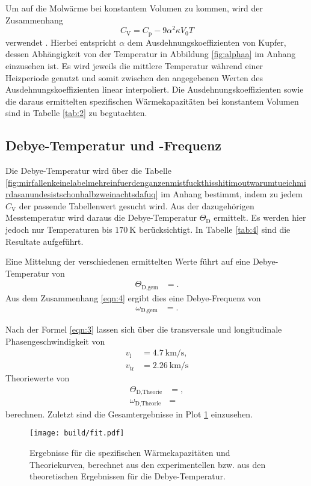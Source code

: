 Um auf die Molwärme bei konstantem Volumen zu kommen, wird der Zusammenhang
\begin{equation}
  C_{\text{V}} = C_{\text{p}} - 9 \alpha^2 \kappa V_0 T
\end{equation}
verwendet \cite{skript}.
Hierbei entspricht $\alpha$ dem Ausdehnungskoeffizienten von Kupfer, dessen Abhängigkeit von der Temperatur in Abbildung \ref{fig:alphaa} im Anhang einzusehen ist.
Es wird jeweils die mittlere Temperatur während einer Heizperiode genutzt und somit zwischen den angegebenen Werten des Ausdehnungskoeffizienten linear interpoliert.
Die Ausdehnungskoeffizienten sowie die daraus ermittelten spezifischen Wärmekapazitäten bei konstantem Volumen sind in Tabelle \ref{tab:2} zu begutachten.



\subsection{Debye-Temperatur und -Frequenz}

Die Debye-Temperatur wird über die Tabelle \ref{fig:mirfallenkeinelabelmehreinfuerdenganzenmistfuckthisshitimoutwarumtueichmirdasanundesistschonhalbzweinachtsdafuq} im Anhang bestimmt, indem zu jedem $C_{\text{V}}$ der passende Tabellenwert gesucht wird.
Aus der dazugehörigen Messtemperatur wird daraus die Debye-Temperatur $\Theta_\text{D}$ ermittelt.
Es werden hier jedoch nur Temperaturen bis $\SI{170}{\kelvin}$ berücksichtigt.
In Tabelle \ref{tab:4} sind die Resultate aufgeführt.



Eine Mittelung der verschiedenen ermittelten Werte führt auf eine Debye-Temperatur von
\begin{align*}
  \Theta_{\text{D,gem}} &= .
\end{align*}
Aus dem Zusammenhang \eqref{eqn:4} ergibt dies eine Debye-Frequenz von
\begin{align*}
  \omega_{\text{D,gem}} &= .
\end{align*}

Nach der Formel \eqref{eqn:3} lassen sich über die transversale und longitudinale Phasengeschwindigkeit \cite{skript} von
\begin{align*}
  v_{\text{l}}  &= \SI{4.7}{\kilo\meter\per\second},\\
  v_{\text{tr}} &= \SI{2.26}{\kilo\meter\per\second}
\end{align*}
Theoriewerte von
\begin{align*}
  \Theta_{\text{D,Theorie}} &= ,\\
  \omega_{\text{D,Theorie}} &= 
\end{align*}
berechnen.
Zuletzt sind die Gesamtergebnisse in Plot \ref{plot:1} einzusehen.

\begin{figure}
  \centering
  \texttt{[image: build/fit.pdf]}
  \caption{Ergebnisse für die spezifischen Wärmekapazitäten und Theoriekurven, berechnet aus den experimentellen bzw. aus den theoretischen Ergebnissen für die Debye-Temperatur.}
  \label{plot:1}
\end{figure}

